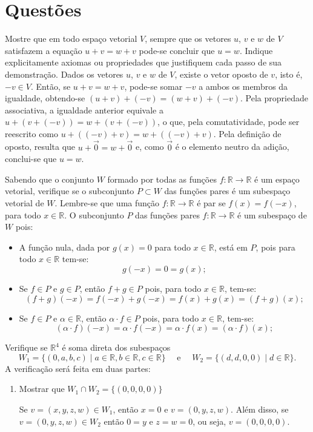 \documentclass[12pt,a4paper]{article}
\newcommand*\R{\mathbb{R}}
\begin{document}
\section*{Questões}
\begin{ExerciseList}
\Exercise[title={2,0}] Mostre que em todo espaço vetorial $V$, sempre que os vetores $u$, $v$ e $w$ de $V$ satisfazem a equação $u+v=w+v$ pode-se concluir que $u = w$. Indique explicitamente axiomas ou propriedades que justifiquem cada passo de sua demonstração.
\Answer
Dados os vetores $u$, $v$ e $w$ de $V$, existe o vetor oposto de $v$, isto é, $-v \in V$. Então, se $u+v=w+v$, pode-se somar $-v$ a ambos os membros da igualdade, obtendo-se $(u+v)+(-v)=(w+v)+(-v)$. Pela propriedade associativa, a igualdade anterior equivale a $u+(v+(-v))=w+(v+(-v))$, o que, pela comutatividade, pode ser reescrito como $u+((-v)+v)=w+((-v)+v)$. Pela definição de oposto, resulta que $u+\vec{0}=w+\vec{0}$ e, como $\vec{0}$ é o elemento neutro da adição, conclui-se que $u = w$.

\Exercise[title={2,0}] Sabendo que o conjunto $W$ formado por todas as funções $f:\R \to \R$ é um espaço vetorial, verifique se o subconjunto $P \subset W$ das funções pares é um subespaço vetorial de $W$. Lembre-se que uma função $f:\R \to \R$ é par se $f(x) = f(-x)$, para todo $x \in \R$.
\Answer
O subconjunto $P$ das funções pares $f:\R \to \R$ é um subespaço de $W$ pois:
\begin{itemize}
\item A função nula, dada por $g(x) = 0$ para todo $x \in \R$, está em $P$, pois para todo $x \in \R$ tem-se:
\[
g(-x) = 0 = g(x);
\]
\item Se $f \in P$ e $g \in P$, então $f+g \in P$ pois, para todo $x \in \R$, tem-se:
\[
(f+g)(-x) = f(-x) + g(-x) = f(x) + g(x) = (f+g)(x);
\]
\item Se $f \in P$ e $\alpha \in \R$, então $\alpha \cdot f \in P$ pois, para todo $x \in \R$, tem-se:
\[
(\alpha \cdot f)(-x) = \alpha \cdot f(-x) = \alpha \cdot f(x) = (\alpha \cdot f)(x);
\]
\end{itemize}

\Exercise[title={2,0}] Verifique se $\R^4$ é soma direta dos subespaços
\[
W_1 = \{(0,a,b,c) \mid a \in \R, b \in \R, c \in \R\}
\quad\text{ e }\quad
W_2 = \{(d,d,0,0) \mid d \in \R\}.
\]
\Answer
A verificação será feita em duas partes:
\begin{enumerate}
\item Mostrar que $W_1 \cap W_2 = \{ (0,0,0,0) \}$

Se $v = (x,y,z,w) \in W_1$, então $x=0$ e $v = (0,y,z,w)$. Além disso, se $v = (0,y,z,w) \in W_2$ então $0 = y$ e $z=w=0$, ou seja, $v = (0,0,0,0)$.


\end{enumerate}
\end{ExerciseList}
\end{document}
